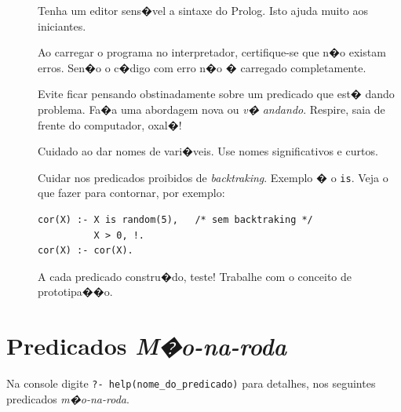 \documentclass[final,a4paper]{article}
\begin{document}
\begin{description}

\item [] Tenha um editor sens�vel a sintaxe do Prolog. Isto ajuda
muito aos iniciantes.

\item [] Ao carregar o programa no interpretador, certifique-se
que n�o existam erros. Sen�o o c�digo com erro n�o � carregado completamente.

\item [] Evite ficar pensando obstinadamente sobre um predicado
que est� dando problema. Fa�a uma abordagem nova ou {\em v� andando}.
Respire, saia de frente do computador, oxal�!

\item [] Cuidado ao dar nomes de vari�veis. Use nomes significativos
e curtos.

\item [] Cuidar nos predicados proibidos de {\em backtraking}. Exemplo
� o {\tt is}. Veja o que fazer para contornar, por exemplo:
{\small
\begin{verbatim}
cor(X) :- X is random(5),   /* sem backtraking */
          X > 0, !.
cor(X) :- cor(X).
\end{verbatim}
}
\item [] A cada predicado constru�do, teste! Trabalhe
com o conceito de prototipa��o.
\end{description}

\section{Predicados {\em M�o-na-roda}}

 Na console digite {\tt ?- help(nome\_do\_predicado)} para detalhes, nos seguintes
predicados {\em m�o-na-roda}.
\end{document}
